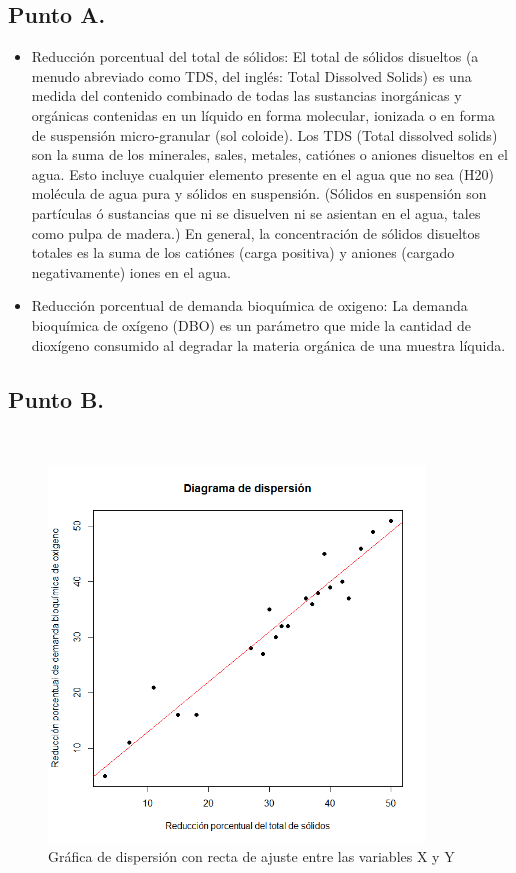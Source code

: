 \documentclass[letterpaper,12pt,onecolumn,titlepage]{article}
\begin{document}
\subsection{Punto A.}
\begin{itemize}
\item Reducci\'{o}n porcentual del total de s\'{o}lidos: El total de s\'{o}lidos disueltos (a menudo abreviado como TDS, del ingl\'{e}s: Total Dissolved Solids) es una medida del contenido combinado de todas las sustancias inorg\'{a}nicas y org\'{a}nicas contenidas en un l\'{i}quido en forma molecular, ionizada o en forma de suspensi\'{o}n micro-granular (sol coloide). 
Los TDS (Total dissolved solids) son la suma de los minerales, sales, metales, cati\'{o}nes o aniones disueltos en el agua. Esto incluye cualquier elemento presente en el agua que no sea (H20) mol\'{e}cula de agua pura y s\'{o}lidos en suspensi\'{o}n. (S\'{o}lidos en suspensi\'{o}n son part\'{i}culas \'{o} sustancias que ni se disuelven ni se asientan en el agua, tales como pulpa de madera.)
En general, la concentraci\'{o}n de s\'{o}lidos disueltos totales es la suma de los cati\'{o}nes (carga positiva) y aniones (cargado negativamente) iones en el agua.
\item Reducci\'{o}n porcentual de demanda bioqu\'{i}mica de oxigeno: La demanda bioqu\'{i}mica de ox\'{i}geno (DBO) es un par\'{a}metro que mide la cantidad de diox\'{i}geno consumido al degradar la materia org\'{a}nica de una muestra l\'{i}quida.
\end{itemize} 
\pagebreak\subsection{Punto B.}
~\\ \begin{figure}[!h]
    \begin{center}
        \includegraphics[width=10cm]{Figuras/punto1b.png}
        \caption{Gr\'{a}fica de dispersi\'{o}n con recta de ajuste entre las variables X y Y}
        \label{fig:Densidad}
    \end{center}
\end{figure}
\end{document}
